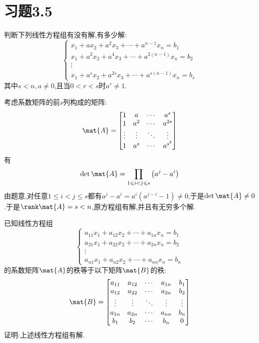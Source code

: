 \documentclass{ctexart}
\begin{document}
\section*{习题3.5}
\begin{homework}[2]
    判断下列线性方程组有没有解,有多少解:
    \[\left\{\begin{array}{c}
        x_1+ax_2+a^2x_3+\cdots+a^{n-1}x_n=b_1\\
        x_1+a^2x_2+a^4x_3+\cdots+a^{2(n-1)}x_n=b_2\\
        \vdots\\
        x_1+a^sx_2+a^{2s}x_3+\cdots+a^{s(n-1)}x_n=b_s
    \end{array}\right.\]
    其中$s<n,a\neq0$,且当$0<r<s$时$a^r\neq1$.
\end{homework}
\begin{solution}
    考虑系数矩阵的前$s$列构成的矩阵:
    \[\mat{A}=\begin{bmatrix}
        1&a&\cdots&a^s\\
        1&a^2&\cdots&a^{2s}\\
        \vdots&\vdots&\ddots&\vdots\\
        1&a^s&\cdots&a^{s^2}
    \end{bmatrix}\]
    有
    \[\det\mat{A}=\prod_{1\leqslant i<j\leqslant s}\left(a^j-a^i\right)\]
    由题意,对任意$1\leqslant i<j\leqslant s$都有$a^j-a^i=a^i\left(a^{j-i}-1\right)\neq0$,于是$\det\mat{A}\neq0$.于是$\rank\mat{A}=s<n$,原方程组有解,并且有无穷多个解.
\end{solution}
\begin{homework}[4]
    已知线性方程组
    \[\left\{\begin{array}{c}
        a_{11}x_1+a_{12}x_2+\cdots+a_{1n}x_n=b_1\\
        a_{21}x_1+a_{22}x_2+\cdots+a_{2n}x_n=b_2\\
        \vdots\\
        a_{n1}x_1+a_{n2}x_2+\cdots+a_{nn}x_n=b_n
    \end{array}\right.\]
    的系数矩阵$\mat{A}$的秩等于以下矩阵$\mat{B}$的秩:
    \[\mat{B}=\begin{bmatrix}
        a_{11}&a_{12}&\cdots&a_{1n}&b_1\\
        a_{12}&a_{22}&\cdots&a_{2n}&b_2\\
        \vdots&\vdots&\ddots&\vdots&\vdots\\
        a_{1n}&a_{2n}&\cdots&a_{nn}&b_n\\
        b_1&b_2&\cdots&b_n&0
    \end{bmatrix}\]
    证明:上述线性方程组有解.
\end{homework}
\end{document}

